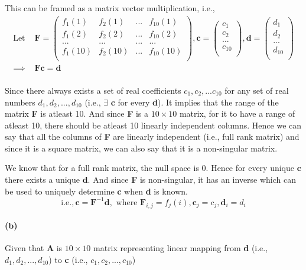 \documentclass[12pt, letterpaper]{article}
\begin{document}
This can be framed as a matrix vector multiplication, i.e.,
\[\begin{split}
  \text{Let } &\mathbf{F} =
  \begin{pmatrix}
    f_1(1) &f_2(1) &... &f_{10}(1)\\
    f_1(2) &f_2(2) &... &f_{10}(2)\\
    ... &... &... &...\\
    f_1(10) &f_2(10) &... &f_{10}(10)\\
  \end{pmatrix}, \mathbf{c} =
  \begin{pmatrix}
    c_1\\c_2\\...\\c_{10}\\
  \end{pmatrix}, \mathbf{d} =
  \begin{pmatrix}
    d_1\\d_2\\...\\d_{10}\\
  \end{pmatrix}\\
  \implies &\mathbf{Fc} = \mathbf{d}\\
\end{split}\]

Since there always exists a set of real coefficients $c_1, c_2, ...c_{10}$ for any set of real numbers $d_1, d_2, ...,d_{10}$ (i.e., $\exists$ \textbf{c} for every \textbf{d}). It implies that the range of the matrix \textbf{F} is atleast 10. And since \textbf{F} is a $10 \times 10$ matrix, for it to have a range of atleast 10, there should be atleast 10 linearly independent columns. Hence we can say that all the columns of \textbf{F} are linearly independent (i.e., full rank matrix) and since it is a square matrix, we can also say that it is a non-singular matrix. \newline

We know that for a full rank matrix, the null space is $0$. Hence for every unique $\mathbf{c}$ there exists a unique $\mathbf{d}$. And since \textbf{F} is non-singular, it has an inverse which can be used to uniquely determine \textbf{c} when \textbf{d} is known.
\[
  \text{i.e.,}\, \boxed{\mathbf{c} = \mathbf{F}^{-1}\mathbf{d}},
  \text{ where } \mathbf{F}_{i,j} = f_j(i), \mathbf{c}_j = c_j, \mathbf{d}_i = d_i
\]

\paragraph{(b)} Given that \textbf{A} is $10 \times 10$ matrix representing linear mapping from \textbf{d} (i.e., $d_1, d_2, ..., d_{10}$) to \textbf{c} (i.e., $c_1, c_2, ..., c_{10}$)
\end{document}

